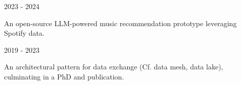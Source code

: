 

\begin{cventries}

  \cventrythin
    {}
    {2023 - 2024} %
    {
          \begin{cvitems} %
	        \item {An open-source LLM-powered music recommendation prototype leveraging Spotify data.}
	      \end{cvitems}
    }









  \cventrythin
    {} %
    {2019 - 2023} %
    {
          \begin{cvitems} %
			\item {An architectural pattern for data exchange (Cf. data mesh, data lake), culminating in a PhD and publication.}
	      \end{cvitems}
    }



\end{cventries}
